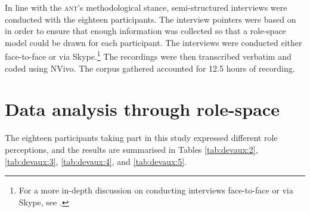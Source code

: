 \documentclass[output=paper]{langsci/langscibook}
\begin{document}
In line with the \textsc{ant}’s methodological stance, semi-structured interviews were conducted with the eighteen participants. The interview pointers were based on  in order to ensure that enough information was collected so that a role-space model could be drawn for each participant. The interviews were conducted either face-to-face or via Skype.{\footnote{For a more in-depth discussion on conducting interviews face-to-face or via Skype, see \citet{Devaux2017b}.}} The recordings were then transcribed verbatim and coded using NVivo. The corpus gathered accounted for 12.5 hours of recording. 

\section{Data analysis through role-space}
\label{sec:devaux:5}
The eighteen participants taking part in this study expressed different role perceptions, and the results are summarised in Tables \ref{tab:devaux:2}, \ref{tab:devaux:3}, \ref{tab:devaux:4}, and \ref{tab:devaux:5}.

\begin{table}
\caption{Role-space in \textsc{vci a}\label{tab:devaux:2}}
\end{table}
\end{document}
